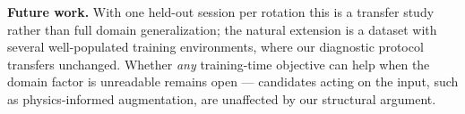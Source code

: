 \textbf{Future work.} With one held-out session per rotation this is a
transfer study rather than full domain generalization; the natural extension
is a dataset with several well-populated training environments, where our
diagnostic protocol transfers unchanged. Whether \emph{any} training-time
objective can help when the domain factor is unreadable remains open ---
candidates acting on the input, such as physics-informed augmentation, are
unaffected by our structural argument.
